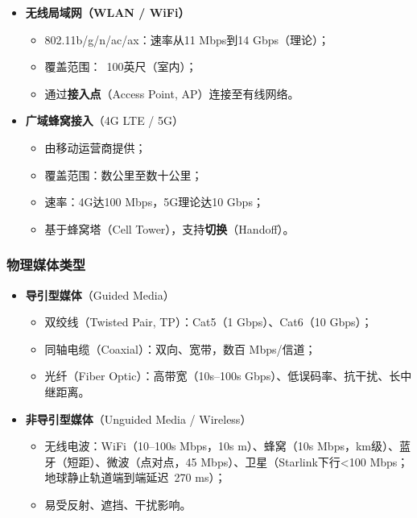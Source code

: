 \begin{itemize}
    \item \textbf{无线局域网（WLAN / WiFi）}
          \begin{itemize}
              \item 802.11b/g/n/ac/ax：速率从11 Mbps到14 Gbps（理论）；
              \item 覆盖范围：~100英尺（室内）；
              \item 通过\textbf{接入点}（Access Point, AP）连接至有线网络。
          \end{itemize}

    \item \textbf{广域蜂窝接入}（4G LTE / 5G）
          \begin{itemize}
              \item 由移动运营商提供；
              \item 覆盖范围：数公里至数十公里；
              \item 速率：4G达100 Mbps，5G理论达10 Gbps；
              \item 基于蜂窝塔（Cell Tower），支持\textbf{切换}（Handoff）。
          \end{itemize}
\end{itemize}

\subsubsection{物理媒体类型}

\begin{itemize}
    \item \textbf{导引型媒体}（Guided Media）
          \begin{itemize}
              \item 双绞线（Twisted Pair, TP）：Cat5（1 Gbps）、Cat6（10 Gbps）；
              \item 同轴电缆（Coaxial）：双向、宽带，数百 Mbps/信道；
              \item 光纤（Fiber Optic）：高带宽（10s–100s Gbps）、低误码率、抗干扰、长中继距离。
          \end{itemize}

    \item \textbf{非导引型媒体}（Unguided Media / Wireless）
          \begin{itemize}
              \item 无线电波：WiFi（10–100s Mbps，10s m）、蜂窝（10s Mbps，km级）、蓝牙（短距）、微波（点对点，45 Mbps）、卫星（Starlink下行<100 Mbps；地球静止轨道端到端延迟~270 ms）；
              \item 易受反射、遮挡、干扰影响。
          \end{itemize}
\end{itemize}

